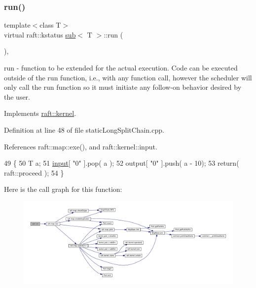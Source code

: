 \subsubsection{\texorpdfstring{run()}{run()}\hspace{0.1cm}{\footnotesize\ttfamily [7/12]}}
{\footnotesize\ttfamily template$<$class T$>$ \\
virtual raft\+::kstatus \hyperlink{classsub}{sub}$<$ T $>$\+::run (\begin{DoxyParamCaption}{ }\end{DoxyParamCaption})\hspace{0.3cm}{\ttfamily [inline]}, {\ttfamily [virtual]}}

run -\/ function to be extended for the actual execution. Code can be executed outside of the run function, i.\+e., with any function call, however the scheduler will only call the run function so it must initiate any follow-\/on behavior desired by the user. 

Implements \hyperlink{classraft_1_1kernel_a05094286d7577360fb1b91c91fc05901}{raft\+::kernel}.



Definition at line 48 of file static\+Long\+Split\+Chain.\+cpp.



References raft\+::map\+::exe(), and raft\+::kernel\+::input.


\begin{DoxyCode}
49     \{
50         T a;
51         \hyperlink{classraft_1_1kernel_a6edbe35a56409d402e719b3ac36d6554}{input}[ \textcolor{stringliteral}{"0"} ].pop( a );
52         output[ \textcolor{stringliteral}{"0"} ].push( a - 10);
53         \textcolor{keywordflow}{return}( raft::proceed );
54     \}
\end{DoxyCode}
Here is the call graph for this function\+:
\nopagebreak
\begin{figure}[H]
\begin{center}
\leavevmode
\includegraphics[width=350pt]{classsub_a0a0c7461433ee8b5f4b24305282bf69a_cgraph}
\end{center}
\end{figure}
\hypertarget{classsub_a0a0c7461433ee8b5f4b24305282bf69a}{}\label{classsub_a0a0c7461433ee8b5f4b24305282bf69a} 

